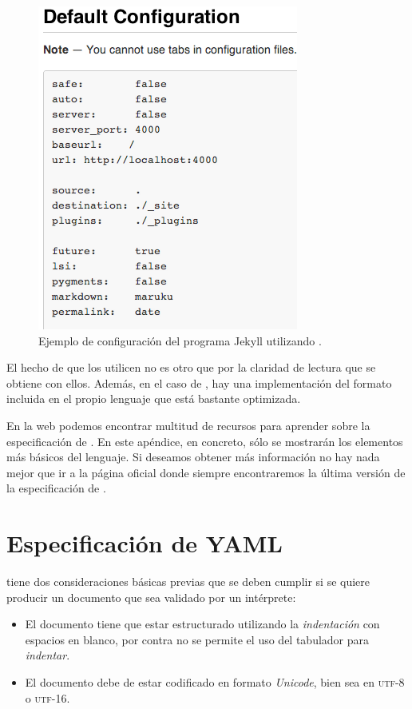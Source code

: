 \begin{figure}
\centering
\includegraphics[scale=0.8]{../graphics/fig_ejemplo_yaml.png}
\caption{Ejemplo de configuración del programa Jekyll utilizando \yaml{}.}\label{fig:ejemplo_yaml}
\end{figure}

El hecho de que los \profiles{} utilicen \yaml{} no es otro que por la claridad de lectura que se obtiene con ellos. Además, en el caso de \php{}, hay una implementación del formato incluida en el propio lenguaje que está bastante optimizada.

En la web podemos encontrar multitud de recursos para aprender sobre la especificación de \yaml{}. En este apéndice, en concreto, sólo se mostrarán los elementos más básicos del lenguaje. Si deseamos obtener más información no hay nada mejor que ir a la página oficial \cite{web:especificacion-yaml} donde siempre encontraremos la última versión de la especificación de \yaml{}.

\section{Especificación de YAML}

\yaml{} tiene dos consideraciones básicas previas que se deben cumplir si se quiere producir un documento que sea validado por un intérprete:

\begin{itemize}
\item El documento tiene que estar estructurado utilizando la \textit{indentación} con espacios en blanco, por contra no se permite el uso del tabulador para \textit{indentar}.

\item El documento debe de estar codificado en formato \textit{Unicode}, bien sea en \textsc{utf-8} o \textsc{utf-16}.
\end{itemize}

